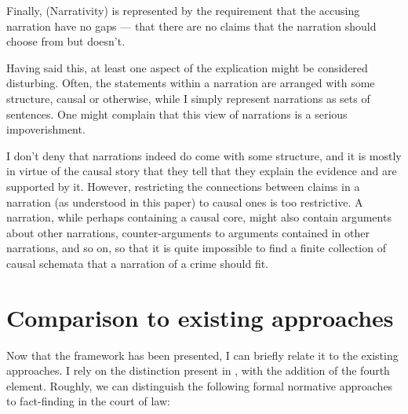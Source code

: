\documentclass[10pt,leqno]{article}
\begin{document}
 Finally, (Narrativity) is represented by the requirement that the accusing narration have no gaps --- that there are no claims that the narration should choose from but doesn't.  
 





Having said this, at least one aspect of the explication might be considered disturbing.  Often,  the statements within a narration are arranged with some structure, causal or otherwise, while I simply represent narrations as sets of sentences.  One might complain that this  view of narrations is a serious impoverishment. 

 I don't deny that narrations indeed do come with some structure, and it is mostly in virtue of the causal  story that they tell that they explain the evidence  and are supported by it. However, restricting the connections between claims in a narration (as understood in this paper) to causal ones is too restrictive. A narration, while perhaps containing a causal core, might also contain arguments about other narrations, counter-arguments to arguments contained in other narrations, and so on, so that it is quite impossible to find a finite collection of causal schemata that a narration of a crime should fit. 
 




\section{Comparison to existing approaches}\label{sec:comparison_to_existing}

Now that the framework has been presented, I can briefly relate it to the existing approaches. I  rely on the distinction present in \citep{verheij2015arguments}, with the addition of the fourth element. Roughly, we can distinguish the following formal normative approaches to fact-finding in the court of law:
\end{document}
